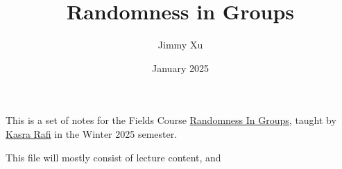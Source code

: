 \documentclass[11pt]{scrartcl}
\begin{document}
\title{Randomness in Groups}
\author{Jimmy Xu}
\date{January 2025}


\maketitle

This is a set of notes for the Fields Course \href{http://www.fields.utoronto.ca/activities/24-25/SGC-randomness}{Randomness In Groups}, taught by \href{https://www.math.toronto.edu/rafi/}{Kasra Rafi} in the Winter 2025 semester.

This file will mostly consist of lecture content, and 
\end{document}
